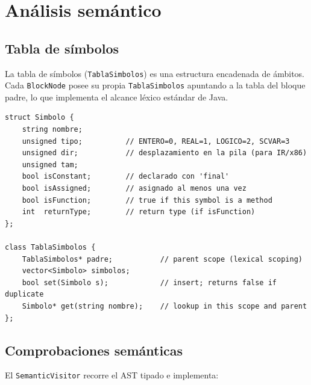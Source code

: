 \chapter{Análisis semántico}
\label{chap:semantica}

\section{Tabla de símbolos}

La tabla de símbolos (\texttt{TablaSimbolos}) es una estructura encadenada de
ámbitos. Cada \texttt{BlockNode} posee su propia \texttt{TablaSimbolos} apuntando
a la tabla del bloque padre, lo que implementa el alcance léxico estándar de Java.

\begin{lstlisting}[style=cpp, caption={Estructura de la tabla de símbolos}]
struct Simbolo {
    string nombre;
    unsigned tipo;          // ENTERO=0, REAL=1, LOGICO=2, SCVAR=3
    unsigned dir;           // desplazamiento en la pila (para IR/x86)
    unsigned tam;
    bool isConstant;        // declarado con 'final'
    bool isAssigned;        // asignado al menos una vez
    bool isFunction;        // true if this symbol is a method
    int  returnType;        // return type (if isFunction)
};

class TablaSimbolos {
    TablaSimbolos* padre;           // parent scope (lexical scoping)
    vector<Simbolo> simbolos;
    bool set(Simbolo s);            // insert; returns false if duplicate
    Simbolo* get(string nombre);    // lookup in this scope and parent
};
\end{lstlisting}

\section{Comprobaciones semánticas}

El \texttt{SemanticVisitor} recorre el AST tipado e implementa:


